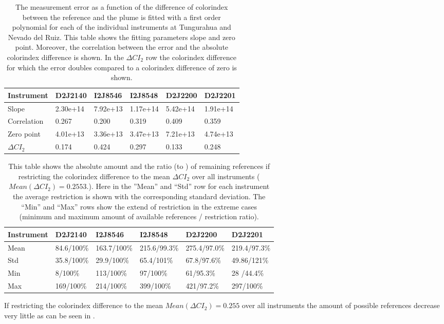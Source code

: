 	\begin{table}[h]
	\centering
	\begin{tabular}{|p{2cm}|p{2cm}|p{2cm}|p{2cm}|p{2cm}|p{2cm}|}
		Instrument	&D2J2140&I2J8546& I2J8548&D2J2200&D2J2201\\
		\toprule
		Slope&2.30e+14 &7.92e+13 &1.17e+14 &5.42e+14&1.91e+14\\
		\midrule
		Correlation&
		0.267&
		0.200&
		0.319&
		0.409&
		0.359\\
		\midrule
		Zero point&4.01e+13&3.36e+13&3.47e+13& 7.21e+13& 4.74e+13\\
		\midrule
		$\Delta CI_{2}$&0.174&0.424&0.297&0.133&0.248\\
		\bottomrule
	\end{tabular}
	\caption{The  measurement error as a function of the difference of colorindex between the reference and the plume is fitted with a first order polynomial for each of the individual instruments at Tungurahua and Nevado del Ruiz. This table shows the fitting parameters slope and zero point. Moreover, the correlation between the  error and the absolute colorindex difference is shown. In the $\Delta CI_{2}$ row the colorindex difference for which the error doubles compared to a colorindex difference of zero is shown.}
	\label{tab:colidxcalc}
\end{table}

	\begin{table}[h]
	\centering
	\begin{tabular}{|p{1.8cm}|p{2.15cm}|p{2.15cm}|p{2.15cm}|p{2.15cm}|p{2.15cm}|}
		Instrument	&D2J2140&I2J8546& I2J8548&D2J2200&D2J2201\\
		\toprule
		Mean&
		84.6/100\% &	163.7/100\%&	215.6/99.3\%&
		275.4/97.0\% &219.4/97.3\% \\
		\midrule
		Std&
		35.8/100\% &	29.9/100\% &
		65.4/101\%&
		67.8/97.6\% &
		49.86/121\% \\
		\midrule
		Min&
		8/100\% &
		113/100\% 
		&97/100\% 
		&61/95.3\% 
		&28	/44.4\% \\
		\midrule
		Max
		&169/100\% 
		&214/100\% 
		&399/100\% 
		&421/97.2\% 
		&297/100\%  \\
		\bottomrule
	\end{tabular}
	\caption{This table shows the absolute amount and the ratio  (to ) of remaining references if restricting the colorindex difference to the mean $\Delta CI_{2}$ over all instruments ($Mean(\Delta CI_{2}) = 0.2553.$). Here in the ”Mean” and “Std” row for each  instrument the average restriction is shown with the corresponding standard deviation. The “Min” and “Max” rows show the extend of restriction in the extreme cases (minimum and maximum amount of available references / restriction ratio).}
	\label{tab:colidxres}
\end{table}	
If restricting the colorindex difference to the mean $Mean(\Delta CI_{2}) = 0.255$ over all instruments the amount of possible references decrease very little as can be seen in .\\


